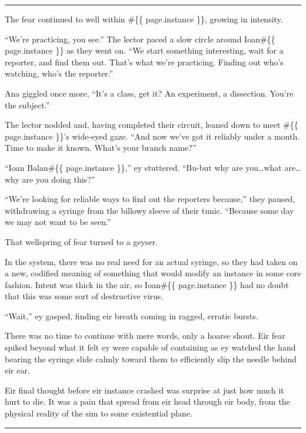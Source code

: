 \begin{center}\rule{0.5\linewidth}{\linethickness}\end{center}

The fear continued to well within \#\{\{ page.instance \}\}, growing in intensity.

``We're practicing, you see.'' The lector paced a slow circle around Ioan\#\{\{ page.instance \}\} as they went on. ``We start something interesting, wait for a reporter, and find them out. That's what we're practicing. Finding out who's watching, who's the reporter.''

Ana giggled once more, ``It's a class, get it? An experiment, a dissection. You're the subject.''

The lector nodded and, having completed their circuit, leaned down to meet \#\{\{ page.instance \}\}'s wide-eyed gaze. ``And now we've got it reliably under a month. Time to make it known. What's your branch name?''

``Ioan Balan\#\{\{ page.instance \}\},'' ey stuttered. ``Bu-but why are you\ldots{}what are\ldots{}why are you doing this?''

``We're looking for reliable ways to find out the reporters because,'' they paused, withdrawing a syringe from the billowy sleeve of their tunic. ``Because some day we may not want to be seen.''

That wellspring of fear turned to a geyser.

In the system, there was no real need for an actual syringe, so they had taken on a new, codified meaning of something that would modify an instance in some core fashion. Intent was thick in the air, so Ioan\#\{\{ page.instance \}\} had no doubt that this was some sort of destructive virus.

``Wait,'' ey gasped, finding eir breath coming in ragged, erratic bursts.

There was no time to continue with mere words, only a hoarse shout. Eir fear spiked beyond what it felt ey were capable of containing as ey watched the hand bearing the syringe slide calmly toward them to efficiently slip the needle behind eir ear.

Eir final thought before eir instance crashed was surprise at just how much it hurt to die. It was a pain that spread from eir head through eir body, from the physical reality of the sim to some existential plane.

\begin{center}\rule{0.5\linewidth}{\linethickness}\end{center}

